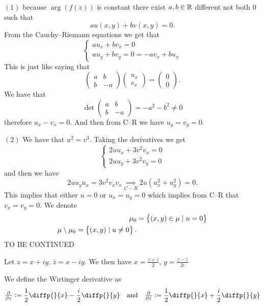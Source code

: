 \documentclass[11pt,a4paper]{article}
\begin{document}
\begin{solution}
  $(1)$ because $\arg(f(z))$ is constant there exist $a,b \in \mathbb{R}$ different
  not both $0$ such that
  \[
    a u(x,y) + b v(x,y) = 0.
  \]
  From the Cauchy--Riemann equations we get that
  \[
    \begin{cases}
      a u_x + b v_x = 0 \\
      a u_y + b v_y = 0 = - a v_x + b u_x
    \end{cases}
  \]
  This is just like saying that
  \[
    \begin{pmatrix}
      a & b \\
      b & -a
    \end{pmatrix}
    \begin{pmatrix}
      u_x \\
      v_x
    \end{pmatrix} =
    \begin{pmatrix}
      0 \\
      0
    \end{pmatrix}.
  \]
  We have that
  \[
    \det 
    \begin{pmatrix}
      a & b \\
      b & -a
    \end{pmatrix} =
    - a^2 - b^2 \neq 0
  \]
  therefore $u_x - v_x = 0$.
  And then from C--R we have $u_y = v_y = 0$.

  $(2)$ We have that $u^2 = v^3$.
  Taking the derivatives we get
  \[
    \begin{cases}
      2 u u_x + 3 v^2 v_x = 0 \\
      2 u u_y + 3 v^2 v_y = 0
    \end{cases}
  \]
  and then we have
  \[
    2 u u_y u_x = 3 v^2 v_x v_x \underset{C-R}{\implies}
    2 u (u_x^2 + u_y^2) = 0.
  \]
  This implies that either $u = 0$ or $u_x = u_y = 0$ which implies from C--R
  that $v_x = v_y = 0$.
  We denote
  \begin{align*}
    \mu_0 &= \set{(x,y) \in \mu \mid u = 0} \\
    \mu \setminus \mu_0 = \set{(x,y) \mid u \neq 0}.
  \end{align*}
  TO BE CONTINUED
\end{solution}

Let $z = x + i y$, $\bar z = x - i y$.
We then have $x = \frac{z + \bar z}{2}$, $y = \frac{z - \bar z}{2i}$

\begin{definition}
  We define the Wirtinger derivative as
  \[
    \pd{}{z} :=
    \half \diffp{}{x} - \frac{i}{2} \diffp{}{y} \tand
    \pd{}{\bar z} :=
    \half \diffp{}{x} + \frac{i}{2} \diffp{}{y}
  \]
\end{definition}
\end{document}
